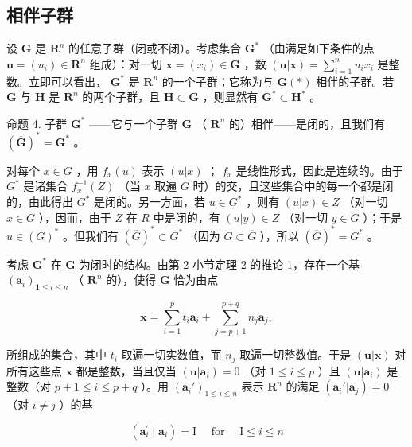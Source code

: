\subsection{相伴子群}

设 \(\mathbf{G}\) 是 \(\mathbf{R}^n\) 的任意子群（闭或不闭）。考虑集合 \(\mathbf{G}^*\) （由满足如下条件的点 \(\boldsymbol{u} = (u_i) \in \mathbf{R}^n\) 组成）：对一切 \(\boldsymbol{x} = (x_i) \in \mathbf{G}\) ，数 \((\boldsymbol{u}| \boldsymbol{x}) = \sum_{i=1}^{n} u_i x_i\) 是整数。立即可以看出， \(\mathbf{G}^*\) 是 \(\mathbf{R}^n\) 的一个子群；它称为与 \(\mathbf{G}(*)\) 相伴的子群。若 \(\mathbf{G}\) 与 \(\mathbf{H}\) 是 \(\mathbf{R}^n\) 的两个子群，且 \(\mathbf{H} \subset \mathbf{G}\) ，则显然有 \(\mathbf{G}^* \subset \mathbf{H}^*\) 。

命题 4. 子群 \(\mathbf{G}^*\) ——它与一个子群 \(\mathbf{G}\) （ \(\mathbf{R}^n\) 的）相伴——是闭的，且我们有 \((\overline{\mathbf{G}})^* = \mathbf{G}^*\) 。

对每个 \(x \in G\) ，用 \(f_x(u)\) 表示 \((u|x)\) ； \(f_x\) 是线性形式，因此是连续的。由于 \(G^*\) 是诸集合 \(f_x^{-1}(Z)\) （当 \(x\) 取遍 \(G\) 时）的交，且这些集合中的每一个都是闭的，由此得出 \(G^*\) 是闭的。另一方面，若 \(u \in G^*\) ，则有 \((u|x) \in Z\) （对一切 \(x \in G\) ），因而，由于 \(Z\) 在 \(R\) 中是闭的，有 \((u|y) \in Z\) （对一切 \(y \in \overline{G}\) ）；于是 \(u \in (G)^*\) 。但我们有 \((\overline{G})^* \subset G^*\) （因为 \(G \subset \overline{G}\) ），所以 \((\overline{G})^* = G^*\) 。

考虑 \(\mathbf{G}^*\) 在 \(\mathbf{G}\) 为闭时的结构。由第 2 小节定理 2 的推论 1，存在一个基 \((\pmb{a}_i)_{\mathbf{1} \leqslant i \leqslant n}\) （ \(\mathbf{R}^n\) 的），使得 \(\mathbf{G}\) 恰为由点

\[
\boldsymbol {x} = \sum_ {i = 1} ^ {p} t _ {i} \boldsymbol {a} _ {i} + \sum_ {j = p + 1} ^ {p + q} n _ {j} \boldsymbol {a} _ {j},
\]

所组成的集合，其中 \(t_i\) 取遍一切实数值，而 \(n_j\) 取遍一切整数值。于是 \((\boldsymbol{u}|\boldsymbol{x})\) 对所有这些点 \(\boldsymbol{x}\) 都是整数，当且仅当 \((\boldsymbol{u}|\boldsymbol{a}_i) = 0\) （对 \(1 \leqslant i \leqslant p\) ）且 \((\boldsymbol{u}|\boldsymbol{a}_i)\) 是整数（对 \(p + 1 \leqslant i \leqslant p + q\) ）。用 \((\boldsymbol{a}_i')_{1 \leqslant i \leqslant n}\) 表示 \(\mathbf{R}^n\) 的满足 \((\boldsymbol{a}_i'|\boldsymbol{a}_j) = 0\) （对 \(i \neq j\) ）的基

\[
\left(\boldsymbol {a} _ {i} ^ {\prime} \mid \boldsymbol {a} _ {i}\right) = \mathrm{I} \quad \text { for } \quad \mathrm{I} \leqslant i \leqslant n
\]

